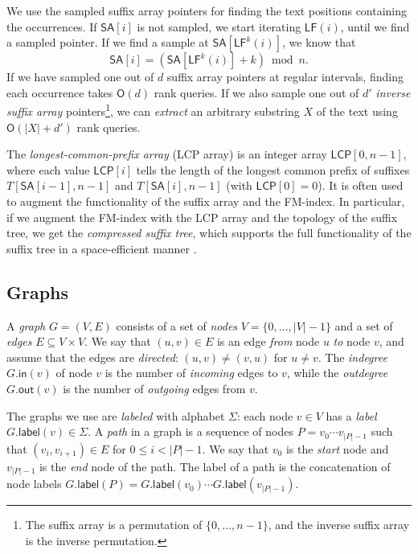 \documentclass[a4paper,UKenglish]{lipics-v2016}
\newcommand{\set}[1]{\ensuremath{\{ #1 \}}}
\newcommand{\abs}[1]{\ensuremath{\lvert #1 \rvert}}
\newcommand{\Oh}[1]{\ensuremath{\mathsf{O}\!\left( #1 \right)}}
\newcommand{\LF}{\ensuremath{\mathsf{LF}}}
\newcommand{\gindegree}{\ensuremath{\mathsf{in}}}
\newcommand{\goutdegree}{\ensuremath{\mathsf{out}}}
\newcommand{\glabel}{\ensuremath{\mathsf{label}}}
\newcommand{\FMindex}{FM\nobreakdash-index}
\newcommand{\SA}{\ensuremath{\mathsf{SA}}}
\newcommand{\LCP}{\ensuremath{\mathsf{LCP}}}
\begin{document}
We use the sampled suffix array pointers for finding the text positions containing the occurrences. If $\SA[i]$ is not sampled, we start iterating $\LF(i)$, until we find a sampled pointer. If we find a sample at $\SA[\LF^{k}(i)]$, we know that
$$
\SA[i] = (\SA[\LF^{k}(i)] + k) \bmod n.
$$
If we have sampled one out of $d$ suffix array pointers at regular intervals, finding each occurrence takes $\Oh{d}$ rank queries. If we also sample one out of $d'$ \emph{inverse suffix array} pointers\footnote{The suffix array is a permutation of $\set{0, \dotsc, n-1}$, and the inverse suffix array is the inverse permutation.}, we can \emph{extract} an arbitrary substring $X$ of the text using $\Oh{\abs{X}+d'}$ rank queries.

The \emph{longest-common-prefix array} (LCP array) \cite{Manber1993} is an integer array $\LCP[0, n-1]$, where each value $\LCP[i]$ tells the length of the longest common prefix of suffixes $T[\SA[i-1], n-1]$ and $T[\SA[i], n-1]$ (with $\LCP[0] = 0$). It is often used to augment the functionality of the suffix array and the \FMindex. In particular, if we augment the \FMindex{} with the LCP array and the topology of the suffix tree, we get the \emph{compressed suffix tree}, which supports the full functionality of the suffix tree in a space-efficient manner \cite{Sadakane2007}.

\subsection{Graphs}\label{sect:graphs}

A \emph{graph} $G = (V, E)$ consists of a set of \emph{nodes} $V = \set{0, \dotsc, \abs{V}-1}$ and a set of \emph{edges} $E \subseteq V \times V$. We say that $(u, v) \in E$ is an edge \emph{from} node $u$ \emph{to} node $v$, and assume that the edges are \emph{directed}: $(u, v) \ne (v, u)$ for $u \ne v$. The \emph{indegree} $G.\gindegree(v)$ of node $v$ is the number of \emph{incoming} edges to $v$, while the \emph{outdegree} $G.\goutdegree(v)$ is the number of \emph{outgoing} edges from $v$.

The graphs we use are \emph{labeled} with alphabet $\Sigma$: each node $v \in V$ has a \emph{label} $G.\glabel(v) \in \Sigma$. A \emph{path} in a graph is a sequence of nodes $P = v_{0} \dotsm v_{\abs{P}-1}$ such that $(v_{i}, v_{i+1}) \in E$ for $0 \le i < \abs{P}-1$. We say that $v_{0}$ is the \emph{start} node and $v_{\abs{P}-1}$ is the \emph{end} node of the path. The label of a path is the concatenation of node labels $G.\glabel(P) = G.\glabel(v_{0}) \dotsm G.\glabel(v_{\abs{P}-1})$.
\end{document}
